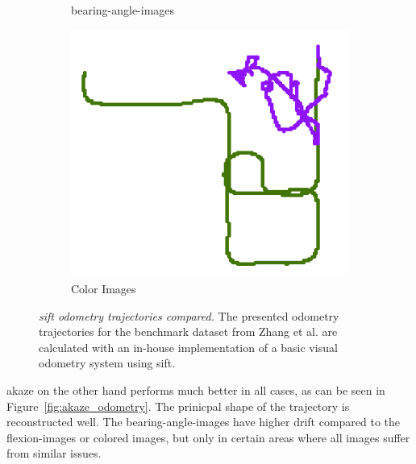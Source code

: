 \begin{figure}[htp]
\begin{subfigure}[b]{0.31\linewidth}
    \caption{\glspl{bearing-angle-image}}
\end{subfigure}%
\begin{subfigure}[b]{0.31\linewidth}
    \includegraphics[width=0.8\linewidth]{chapter06/odo/zhang_pinhole_SIFT_nice.png}%
    \caption{Color Images}
\end{subfigure}
\caption[\acrshort{sift} odometry trajectories compared]{\emph{\acrshort{sift} odometry trajectories compared.} The presented odometry trajectories for the benchmark dataset from Zhang et al.\cite{zhang_icra2016} are calculated with an in-house implementation of a basic visual odometry system using \acrshort{sift}.}\label{fig:sift_odometry}
\end{figure}
\acrshort{akaze} on the other hand performs much better in all cases, as can be seen in Figure~\ref{fig:akaze_odometry}.
The prinicpal shape of the trajectory is reconstructed well.
The \glspl{bearing-angle-image} have higher drift compared to the \glspl{flexion-image} or colored images, but only in certain areas where all images suffer from similar issues.
